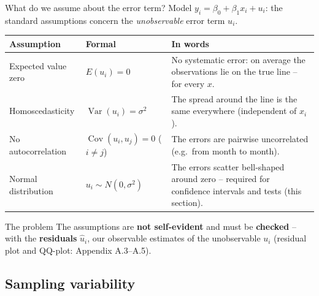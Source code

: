 \documentclass[aspectratio=169,11pt]{beamer}
\begin{document}
\begin{frame}{What do we assume about the error term?}
  \small
  Model $y_i = \beta_0 + \beta_1 x_i + u_i$: the standard assumptions concern
  the \emph{unobservable} error term $u_i$.
  \begin{center}
    \footnotesize
    \renewcommand{\arraystretch}{1.1}
    \begin{tabular}{@{}l l >{\raggedright\arraybackslash}p{7.4cm}@{}}
      \toprule
      \textbf{Assumption} & \textbf{Formal} & \textbf{In words} \\
      \midrule
      Expected value zero  & $E(u_i) = 0$ & No systematic error: on average the
        observations lie on the true line -- for every $x$. \\
      Homoscedasticity     & $\operatorname{Var}(u_i) = \sigma^{2}$ & The
        spread around the line is the same everywhere (independent of $x_i$). \\
      No autocorrelation   & $\operatorname{Cov}(u_i,u_j) = 0$ ($i \ne j$) &
        The errors are pairwise uncorrelated (e.g.\ from month to month). \\
      Normal distribution  & $u_i \sim N(0,\sigma^{2})$ & The errors scatter
        bell-shaped around zero -- required for confidence intervals and
        tests (this section). \\
      \bottomrule
    \end{tabular}
  \end{center}
  \begin{alertblock}{The problem}
    The assumptions are \textbf{not self-evident} and must be
    \textbf{checked} -- with the \textbf{residuals} $\hat{u}_i$, our
    observable estimates of the unobservable $u_i$ (residual plot and
    QQ-plot: Appendix A.3--A.5).
  \end{alertblock}
\end{frame}

\subsection{Sampling variability}
\end{document}

